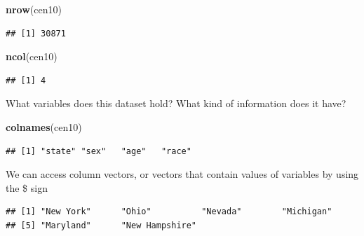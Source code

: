 \documentclass[
]{book}
\newenvironment{Shaded}{\begin{snugshade}}{\end{snugshade}}
\newcommand{\KeywordTok}[1]{\textcolor[rgb]{0.13,0.29,0.53}{\textbf{#1}}}
\newcommand{\NormalTok}[1]{#1}
\newcommand{\OperatorTok}[1]{\textcolor[rgb]{0.81,0.36,0.00}{\textbf{#1}}}
\theoremstyle{definition}
\theoremstyle{definition}
\theoremstyle{definition}
\theoremstyle{remark}
\begin{document}
\begin{Shaded}
\begin{Highlighting}[]
\KeywordTok{nrow}\NormalTok{(cen10)}
\end{Highlighting}
\end{Shaded}

\begin{verbatim}
## [1] 30871
\end{verbatim}

\begin{Shaded}
\begin{Highlighting}[]
\KeywordTok{ncol}\NormalTok{(cen10)}
\end{Highlighting}
\end{Shaded}

\begin{verbatim}
## [1] 4
\end{verbatim}

What variables does this dataset hold? What kind of information does it have?

\begin{Shaded}
\begin{Highlighting}[]
\KeywordTok{colnames}\NormalTok{(cen10)}
\end{Highlighting}
\end{Shaded}

\begin{verbatim}
## [1] "state" "sex"   "age"   "race"
\end{verbatim}

We can access column vectors, or vectors that contain values of variables by using the \$ sign

\begin{Shaded}
\end{Shaded}

\begin{verbatim}
## [1] "New York"      "Ohio"          "Nevada"        "Michigan"     
## [5] "Maryland"      "New Hampshire"
\end{verbatim}

\begin{Shaded}
\end{Shaded}
\end{document}
